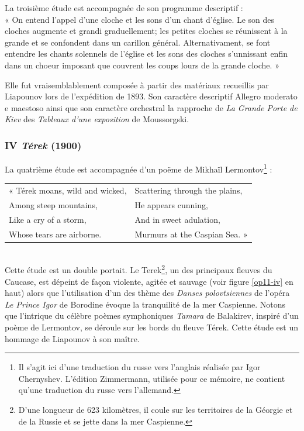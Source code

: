 La troisième étude est accompagnée de son programme descriptif :\\

« On entend l'appel d'une cloche et les sons d'un chant d'église. Le son des cloches augmente et grandi graduellement; les petites cloches se réunissent à la grande et se confondent dans un carillon général. Alternativament, se font entendre les chants solennels de l'église et les sons des cloches s'unnissant enfin dans un choeur imposant que couvrent les coups lours de la grande cloche. »

Elle fut vraisemblablement composée à partir des matériaux recueillis par Liapounov lors de l'expédition de 1893. Son caractère descriptif Allegro moderato e maestoso ainsi que son caractère orchestral la rapproche de \emph{La Grande Porte de Kiev} des \emph{Tableaux d'une exposition} de Moussorgski.

\subsubsection{IV \emph{Térek} (1900)}

La quatrième étude est accompagnée d'un poëme de Mikhaïl Lermontov\footnote{Il s'agit ici d'une traduction du russe vers l'anglais réalisée par Igor Chernyshev. L'édition Zimmermann, utilisée pour ce mémoire, ne contient qu'une traduction du russe vers l'allemand.} :\\

\begin{tabular}{ll}
\hspace{-3.9mm}« Térek moans, wild and wicked,
&
Scattering through the plains,
\\
Among steep mountains,
&
He appears cunning,
\\
Like a cry of a storm,
&
And in sweet adulation,
\\
Whose tears are airborne.
&
Murmurs at the Caspian Sea. »
\end{tabular}\\

Cette étude est un double portait. Le Terek\footnote{D'une longueur de 623 kilomètres, il coule sur les territoires de la Géorgie et de la Russie et se jette dans la mer Caspienne.}, un des principaux fleuves du Caucase, est dépeint de façon violente, agitée et sauvage (voir figure \ref{op11-iv} en haut) alors que l'utilisation d'un des thème des \emph{Danses polovtsiennes} de l'opéra \emph{Le Prince Igor} de Borodine évoque la tranquilité de la mer Caspienne. Notons que l'intrique du célèbre poèmes symphoniques \emph{Tamara} de Balakirev, inspiré d'un poème de Lermontov, se déroule sur les bords du fleuve Térek. Cette étude est un hommage de Liapounov à son maître.

